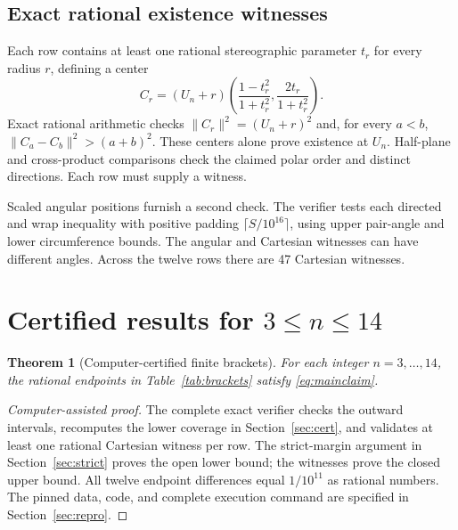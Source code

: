 \documentclass[11pt]{article}
\newtheorem{theorem}{Theorem}[section]
\theoremstyle{definition}
\theoremstyle{remark}
\newcommand{\Rstar}{R^*}
\begin{document}
\subsection{Exact rational existence witnesses}
Each row contains at least one rational stereographic parameter $t_r$ for
every radius $r$, defining a center
\begin{equation}\label{eq:stereo}
 C_r=(U_n+r)\left(\frac{1-t_r^2}{1+t_r^2},
                         \frac{2t_r}{1+t_r^2}\right).
\end{equation}
Exact rational arithmetic checks $\|C_r\|^2=(U_n+r)^2$ and, for
every $a<b$, $\|C_a-C_b\|^2>(a+b)^2$. These centers alone prove
existence at $U_n$. Half-plane and cross-product comparisons check the
claimed polar order and distinct directions. Each row must supply a witness.

Scaled angular positions furnish a second check. The verifier tests each
directed and wrap inequality with positive padding $\lceil S/10^{16}\rceil$,
using upper pair-angle and lower circumference bounds. The angular and
Cartesian witnesses can have different angles. Across the twelve rows
there are 47 Cartesian witnesses.

\section{Certified results for \texorpdfstring{$3\le n\le14$}{3 <= n <= 14}}\label{sec:results}
\begin{theorem}[Computer-certified finite brackets]\label{thm:brackets}
For each integer $n=3,\ldots,14$, the rational endpoints in
Table~\ref{tab:brackets} satisfy \eqref{eq:mainclaim}.
\end{theorem}
\begin{proof}[Computer-assisted proof]
The complete exact verifier checks the outward intervals, recomputes the
lower coverage in Section~\ref{sec:cert}, and validates at least one
rational Cartesian witness per row. The strict-margin argument in
Section~\ref{sec:strict} proves the open lower bound; the witnesses prove
the closed upper bound. All twelve endpoint differences equal $1/10^{11}$
as rational numbers. The pinned data, code, and complete execution command
are specified in Section~\ref{sec:repro}.
\end{proof}

\begin{table}[htbp]\centering
\caption{Exact global brackets. The decimal endpoints are rational and satisfy
$L_n<\Rstar(n)\le U_n$. The last column counts the supplied upper witnesses.}
\label{tab:brackets}

\end{table}
\end{document}
